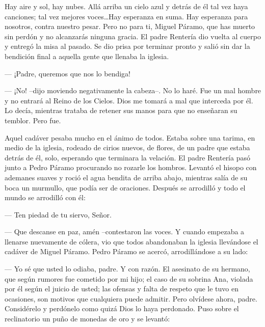   \guillemotleft Hay aire y sol, hay nubes. Allá arriba un cielo azul y detrás de él tal vez haya canciones; tal vez mejores voces\ldots Hay esperanza en suma. Hay esperanza para nosotros, contra nuestro pesar.
\pend
%
\pstart
  \guillemotright Pero no para ti, Miguel Páramo, que has muerto sin perdón y no alcanzarás ninguna gracia.\guillemotright
\pend
%
\pstart
  El padre Rentería dio vuelta al cuerpo y entregó la misa al pasado. Se dio prisa por terminar pronto y salió sin dar la bendición final a aquella gente que llenaba la iglesia.

  --- ¡Padre, queremos que nos lo bendiga!

  --- ¡No! --dijo moviendo negativamente la cabeza--. No lo haré. Fue un mal hombre y no entrará al Reino de los Cielos. Dios me tomará a mal que interceda por él.
\pend
%
\pstart
  Lo decía, mientras trataba de retener sus manos para que no enseñaran su temblor. Pero fue.

\pend
%
\pstart
  Aquel cadáver pesaba mucho en el ánimo de todos. Estaba sobre una tarima, en medio de la iglesia, rodeado de cirios nuevos, de flores, de un padre que estaba detrás de él, solo, esperando que terminara la velación.
\pend
%
\pstart
  El padre Rentería pasó junto a Pedro Páramo procurando no rozarle los hombros. Levantó el hisopo con ademanes suaves y roció el agua bendita de arriba abajo, mientras salía de su boca un murmullo, que podía ser de oraciones. Después se arrodilló y todo el mundo se arrodilló con él:

  --- Ten piedad de tu siervo, Señor.

  --- Que descanse en paz, amén --contestaron las voces.
\pend
%
\pstart
  Y cuando empezaba a llenarse nuevamente de cólera, vio que todos abandonaban la iglesia llevándose el cadáver de Miguel Páramo.
\pend
%
\pstart
  Pedro Páramo se acercó, arrodillándose a su lado:

  --- Yo sé que usted lo odiaba, padre. Y con razón. El asesinato de su hermano, que según rumores fue cometido por mi hijo; el caso de su sobrina Ana, violada por él según el juicio de usted; las ofensas y falta de respeto que le tuvo en ocasiones, son motivos que cualquiera puede admitir. Pero olvídese ahora, padre. Considérelo y perdónelo como quizá Dios lo haya perdonado.
\pend
%
\pstart
  Puso sobre el reclinatorio un puño de monedas de oro y se levantó:

